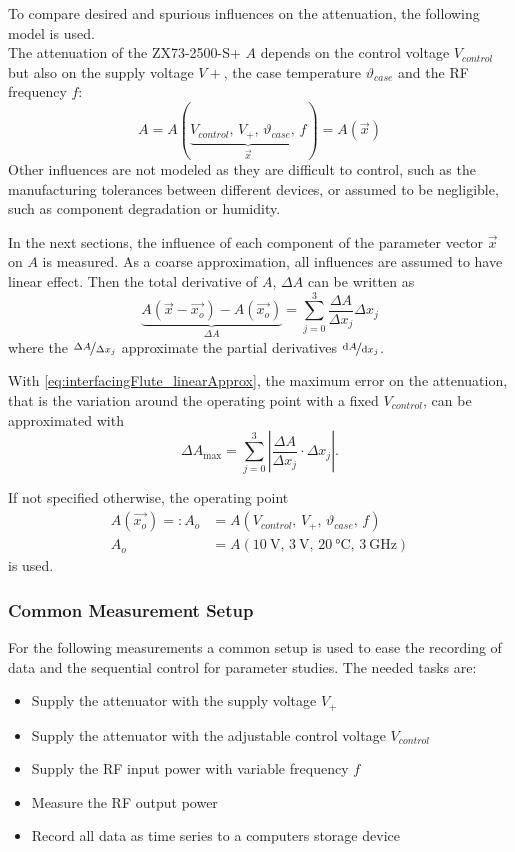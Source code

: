 To compare desired and spurious influences on the attenuation, the following model is used.\\
The attenuation of the ZX73-2500-S+ $A$ depends on the control voltage $V_{control}$ but also on the supply voltage $V+$, the case temperature $\vartheta_{case}$ and the RF frequency $f$:
\begin{equation}
A=A(\underbrace{V_{control},\,V_+,\,\vartheta_{case},\,f}_{\vec{x}}) = A\left(\vec{x}\right)
\end{equation}
Other influences are not modeled as they are difficult to control, such as the manufacturing tolerances between different devices, or assumed to be negligible, such as component degradation or humidity.

In the next sections, the influence of each component of the parameter vector $\vec{x}$ on $A$ is measured. As a coarse approximation, all influences are assumed to have linear effect. Then the total derivative of $A$, $\Delta A$ can be written as
\begin{equation}\label{eq:interfacingFlute_linearApprox}
\underbrace{A(\vec{x}-\vec{x_o})-A(\vec{x_o})}_{\Delta A} = \sum_{j=0}^{3} \frac{\Delta A}{\Delta x_j} \Delta x_j
\end{equation}
where the $\nicefrac{\Delta A}{\Delta x_j}$ approximate the partial derivatives $\nicefrac{\text{d}{A}}{\text{d}{x_j}}$.

With \autoref{eq:interfacingFlute_linearApprox}, the maximum error on the attenuation, that is the variation around the operating point with a fixed $V_{control}$, can be approximated with
\begin{equation}\label{eq:interfacingFlute_maxerror}
\Delta A_{\text{max}} = \sum_{j=0}^{3} \left|\frac{\Delta A}{\Delta x_j} \cdot \Delta x_j\right|.
\end{equation}

If not specified otherwise, the operating point
\begin{align}\label{eq:interfacingFlute_operatingpoint}
A(\vec{x_o}) =: A_o &= A(V_{control},\,V_+,\,\vartheta_{case},\,f)\\
A_o                 &= A\left(\SI{10}{\volt},\,\SI{3}{\volt},\,\SI{20}{\celsius},\,\SI{3}{\GHz}\right)
\end{align}
is used.

\subsubsection{Common Measurement Setup}
For the following measurements a common setup is used to ease the recording of data and the sequential control for parameter studies. The needed tasks are:
\begin{itemize}
\item Supply the attenuator with the supply voltage $V_+$
\item Supply the attenuator with the adjustable control voltage $V_{control}$
\item Supply the RF input power with variable frequency $f$
\item Measure the RF output power
\item Record all data as time series to a computers storage device
\end{itemize}

